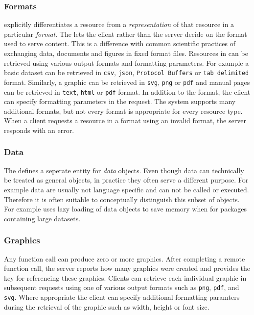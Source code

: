 \subsubsection{Formats}

\OpenCPU explicitly differentiates a resource from a \emph{representation} of that resource in a particular \emph{format}. The \API lets the client rather than the server decide on the format used to serve content. This is a difference with common scientific practices of exchanging data, documents and figures in fixed format files. Resources in \OpenCPU can be retrieved using various output formats and formatting parameters. For example a basic dataset can be retrieved in \texttt{csv}, \texttt{json}, \texttt{Protocol Buffers} or \texttt{tab delimited} format. Similarly, a graphic can be retrieved in \texttt{svg}, \texttt{png} or \texttt{pdf} and manual pages can be retrieved in \texttt{text}, \texttt{html} or \texttt{pdf} format. In addition to the format, the client can specify formatting parameters in the request. The system supports many additional formats, but not every format is appropriate for every resource type. When a client requests a resource in a format using an invalid format, the server responds with an error.   


\subsubsection{Data}

The \API defines a seperate entity for \emph{data} objects. Even though data can technically be treated as general objects, in practice they often serve a different purpose. For example data are usually not language specific and can not be called or executed. Therefore it is often suitable to conceptually distinguish this subset of objects. For example \R uses lazy loading of data objects to save memory when for packages containing large datasets.

\subsubsection{Graphics}

Any function call can produce zero or more graphics. After completing a remote function call, the server reports how many graphics were created and provides the key for referencing these graphics. Clients can retrieve each individual graphic in subsequent requests using one of various output formats such as \texttt{png}, \texttt{pdf}, and \texttt{svg}. Where appropriate the client can specify additional formatting paramters during the retrieval of the graphic such as width, height or font size.

